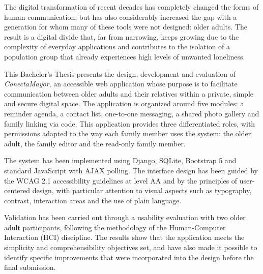 
The digital transformation of recent decades has completely changed the forms
of human communication, but has also considerably increased the gap with a
generation for whom many of these tools were not designed: older adults.
The result is a digital divide that, far from narrowing, keeps growing due to
the complexity of everyday applications and contributes to the isolation of a
population group that already experiences high levels of unwanted loneliness.

This Bachelor's Thesis presents the design, development and evaluation of
\emph{ConectaMayor}, an accessible web application whose purpose is to
facilitate communication between older adults and their relatives within a
private, simple and secure digital space. The application is organized around
five modules: a reminder agenda, a contact list, one-to-one messaging, a
shared photo gallery and family linking via code. This application provides
three differentiated roles, with permissions adapted to the way each family
member uses the system: the older adult, the family editor and the read-only
family member.

The system has been implemented using Django, SQLite, Bootstrap 5 and standard
JavaScript with AJAX polling. The interface design has been guided by the
WCAG 2.1 accessibility guidelines at level AA and by the principles of
user-centered design, with particular attention to visual aspects such as
typography, contrast, interaction areas and the use of plain language.

Validation has been carried out through a usability evaluation with two older
adult participants, following the methodology of the Human-Computer Interaction
(HCI) discipline. The results show that the application meets the simplicity
and comprehensibility objectives set, and have also made it possible to
identify specific improvements that were incorporated into the design before
the final submission.